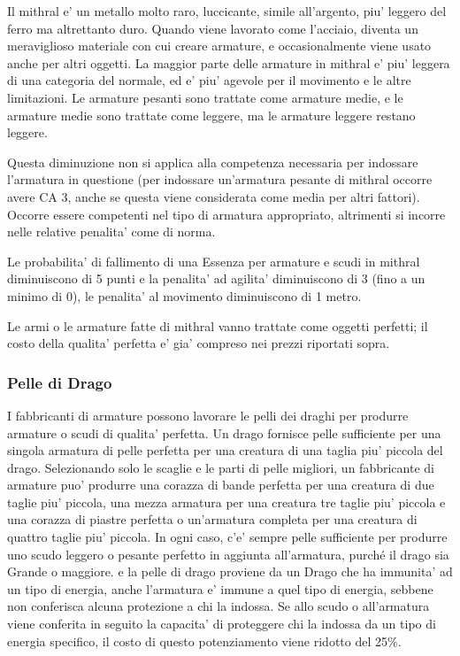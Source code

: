 \documentclass[a4paper,11pt,twoside,openany]{dndbook}
\begin{document}
{Il mithral e' un metallo molto raro, luccicante, simile all'argento, piu' leggero del ferro ma altrettanto duro. Quando viene lavorato come l'acciaio, diventa un meraviglioso materiale con cui creare armature, e occasionalmente viene usato anche per altri oggetti. La maggior parte delle armature in mithral e' piu' leggera di una categoria del normale, ed e' piu' agevole per il movimento e le altre limitazioni. Le armature pesanti sono trattate come armature medie, e le armature medie sono trattate come leggere, ma le armature leggere restano leggere.

Questa diminuzione non si applica alla competenza necessaria per indossare l'armatura in questione (per indossare un'armatura pesante di mithral occorre avere CA 3, anche se questa viene considerata come media per altri fattori). Occorre essere competenti nel tipo di armatura appropriato, altrimenti si incorre nelle relative penalita' come di norma.

Le probabilita' di fallimento di una Essenza per armature e scudi in mithral diminuiscono di 5 punti e la penalita' ad agilita' diminuiscono di 3 (fino a un minimo di 0), le penalita' al movimento diminuiscono di 1 metro.

Le armi o le armature fatte di mithral vanno trattate come oggetti perfetti; il costo della qualita' perfetta e' gia' compreso nei prezzi riportati sopra.

\subsubsection{Pelle di Drago}

\label{pelle-di-drago}

I fabbricanti di armature possono lavorare le pelli dei draghi per produrre armature o scudi di qualita' perfetta.
Un drago fornisce pelle sufficiente per una singola armatura di pelle perfetta per una creatura di una taglia piu' piccola del drago. Selezionando solo le scaglie e le parti di pelle migliori, un fabbricante di armature puo' produrre una corazza di bande perfetta per una creatura di due taglie piu' piccola, una mezza armatura per una creatura tre taglie piu' piccola e una corazza di piastre perfetta o un'armatura completa per una creatura di quattro taglie piu' piccola. In ogni caso, c'e' sempre pelle sufficiente per produrre uno scudo leggero o pesante perfetto in aggiunta all'armatura, purché il drago sia Grande o maggiore. 
e la pelle di drago proviene da un Drago che ha immunita' ad un tipo di energia, anche l'armatura e' immune a quel tipo di energia, sebbene non conferisca alcuna protezione a chi la indossa. Se allo scudo o all'armatura viene conferita in seguito la capacita' di proteggere chi la indossa da un tipo di energia specifico, il costo di questo potenziamento viene ridotto del 25\%.

}
\end{document}
